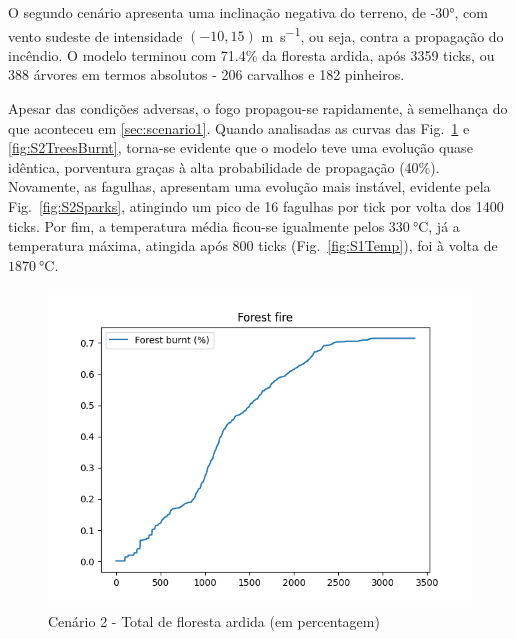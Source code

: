 O segundo cenário apresenta uma inclinação negativa do terreno, de \ang{-30}, com vento sudeste de intensidade $(-10, 15)$ \si{\meter\per\second}, ou seja, contra a propagação do incêndio. O modelo terminou com 71.4\% da floresta ardida, após 3359 ticks, ou 388 árvores em termos absolutos - 206 carvalhos e 182 pinheiros.

Apesar das condições adversas, o fogo propagou-se rapidamente, à semelhança do que aconteceu em \ref{sec:scenario1}. Quando analisadas as curvas das Fig.~\ref{fig:S2ForestBurnt} e \ref{fig:S2TreesBurnt}, torna-se evidente que o modelo teve uma evolução quase idêntica, porventura graças à alta probabilidade de propagação (40\%). Novamente, as fagulhas, apresentam uma evolução mais instável, evidente pela Fig.~\ref{fig:S2Sparks}, atingindo um pico de 16 fagulhas por tick por volta dos 1400 ticks. Por fim, a temperatura média ficou-se igualmente pelos $\SI{330}{\degreeCelsius}$, já a temperatura máxima, atingida após 800 ticks (Fig.~\ref{fig:S1Temp}), foi à volta de $\SI{1870}{\degreeCelsius}$.

\begin{figure}[H]
    \centering
    \includegraphics[width=\textwidth]{src/runs/scenario2/forest_fire.png}
    \caption{Cenário 2 - Total de floresta ardida (em percentagem)}
    \label{fig:S2ForestBurnt}
\end{figure}

